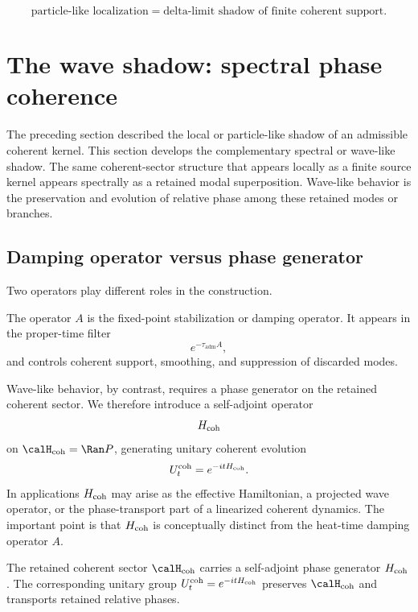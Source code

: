 \documentclass[11pt]{article}
\newcommand{\ta}{\tau_{\mathrm{adm}}}
\begin{document}
\begin{equation}
  \boxed{
  \text{particle-like localization}
  =
  \text{delta-limit shadow of finite coherent support}.
  }
\end{equation}

\section{The wave shadow: spectral phase coherence}
\label{sec:wave-shadow}

The preceding section described the local or particle-like shadow of an admissible coherent
kernel. This section develops the complementary spectral or wave-like shadow. The same
coherent-sector structure that appears locally as a finite source kernel appears spectrally as a
retained modal superposition. Wave-like behavior is the preservation and evolution of relative
phase among these retained modes or branches.

\subsection{Damping operator versus phase generator}
\label{subsec:damping-vs-phase}

Two operators play different roles in the construction.

The operator \(A\) is the fixed-point stabilization or damping operator. It appears in the
proper-time filter
\begin{equation}
  e^{-\ta A},
\end{equation}
and controls coherent support, smoothing, and suppression of discarded modes.

Wave-like behavior, by contrast, requires a phase generator on the retained coherent sector.
We therefore introduce a self-adjoint operator
\begin{equation}
  H_{\rm coh}
\end{equation}
on \(\calH_{\rm coh}=\Ran P\), generating unitary coherent evolution
\begin{equation}
  U_t^{\rm coh}
  =
  e^{-itH_{\rm coh}}.
  \label{eq:coh-unitary}
\end{equation}
In applications \(H_{\rm coh}\) may arise as the effective Hamiltonian, a projected wave
operator, or the phase-transport part of a linearized coherent dynamics. The important point
is that \(H_{\rm coh}\) is conceptually distinct from the heat-time damping operator \(A\).

\begin{assumption}
\label{ass:coherent-phase-evolution}
The retained coherent sector \(\calH_{\rm coh}\) carries a self-adjoint phase generator
\(H_{\rm coh}\). The corresponding unitary group \(U_t^{\rm coh}=e^{-itH_{\rm coh}}\)
preserves \(\calH_{\rm coh}\) and transports retained relative phases.
\end{assumption}
\end{document}
